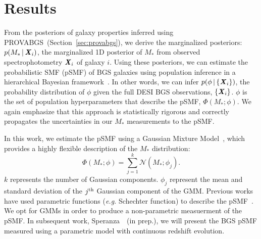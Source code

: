 \section{Results} \label{sec:results}
From the posteriors of galaxy properties inferred using
PROVABGS~(Section~\ref{sec:provabgs}), we derive the marginalized posteriors: 
$p(M_* \,|\, {\textbf{\textit{X}}_i})$, the marginalized 1D posterior of $M_*$ from
observed spectrophotometry ${\textbf{\textit{X}}_i}$ of galaxy $i$.
Using these posteriors, we can estimate the probabilistic SMF (pSMF) of BGS
galaxies using population inference in a hierarchical Bayesian 
framework~\citep[\emph{e.g.}][]{hogg2010, foreman-mackey2014, baronchelli2020}.
In other words, we can infer $p(\phi\,|\,\{{\textbf{\textit{X}}_i}\})$, the probability
distribution of $\phi$ given the full DESI BGS observations, $\{{\textbf{\textit{X}}_i}\}$. 
$\phi$ is the set of population hyperparameters that describe the pSMF,
$\Phi(M_*; \phi)$.
We again emphasize that this approach is statistically rigorous and correctly
propagates the uncertainties in our $M_*$ measurements to the pSMF. 


In this work, we estimate the pSMF using a Gaussian Mixture
Model~\citep[GMM;][]{press1992, mclachlan2000}, which provides a highly flexible
description of the $M_*$ distribution: 
\begin{equation}
    \Phi(M_*; \phi) = \sum\limits_{j=1}^{k} \mathcal{N}(M_*; \phi_j).
\end{equation} 
$k$ represents the number of Gaussian components. 
$\phi_j$ represent the mean and standard deviation of the $j^{\rm th}$ Gaussian
component of the GMM. 
Previous works have used parametric functions (\emph{e.g.} Schechter function)
to describe the pSMF~\citep{leja2019a}. 
We opt for GMMs in order to produce a non-parametric measuerment of the pSMF.
In subsequent work, Speranza~\etal~(in prep.), we will present the BGS pSMF
measured using a parametric model with continuous redshift evolution.  


